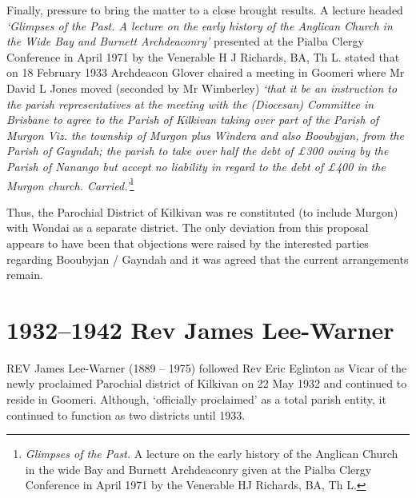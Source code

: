 Finally, pressure to bring the matter to a close brought results. A lecture headed \emph{`Glimpses of the Past. A lecture on the early history of the Anglican Church in the Wide Bay and Burnett Archdeaconry'} presented at the Pialba Clergy Conference in April 1971 by the Venerable H J Richards, BA, Th L. stated that on 18 February 1933 Archdeacon Glover chaired a meeting in Goomeri where Mr David L Jones moved (seconded by Mr Wimberley) \emph{`that it be an instruction to the parish representatives at the meeting with the (Diocesan) Committee in Brisbane to agree to the Parish of Kilkivan taking over part of the Parish of Murgon Viz. the township of Murgon plus Windera and also Booubyjan, from the Parish of Gayndah; the parish to take over half the debt of \pounds300 owing by the Parish of Nanango but accept no liability in regard to the debt of \pounds400 in the Murgon church. Carried.'}\footnote{\emph{Glimpses of the Past.} A lecture on the early history of the Anglican Church in the wide Bay and Burnett Archdeaconry given at the Pialba Clergy Conference in April 1971 by the Venerable HJ Richards, BA, Th L.}


Thus, the Parochial District of Kilkivan was re constituted (to include Murgon) with Wondai as a separate district. The only deviation from this proposal appears to have been that objections were raised by the interested parties regarding Booubyjan / Gayndah and it was agreed that the current arrangements remain.



\balance


\printendnotes[custom]
\setcounter{endnote}{0}
\chapter{1932--1942 Rev James Lee-Warner}
\nobalance


\lettrine[lines=3]{R}{EV}
 James Lee-Warner (1889 -- 1975) followed Rev Eric Eglinton as Vicar of the newly proclaimed Parochial district of Kilkivan on 22 May 1932 and continued to reside in Goomeri. Although, `officially proclaimed' as a total parish entity, it continued to function as two districts until 1933.

